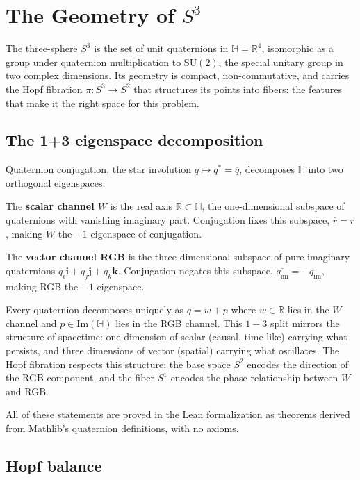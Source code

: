 \documentclass[12pt,a4paper]{article}
\theoremstyle{definition}
\theoremstyle{remark}
\begin{document}
\section{The Geometry of $S^3$}

The three-sphere $S^3$ is the set of unit quaternions in
$\mathbb{H} = \mathbb{R}^4$, isomorphic as a group under quaternion
multiplication to $\mathrm{SU}(2)$, the special unitary group in two complex
dimensions. Its geometry is compact, non-commutative, and carries the Hopf
fibration $\pi: S^3 \to S^2$ that structures its points into fibers: the
features that make it the right space for this problem.

\subsection{The 1+3 eigenspace decomposition}

Quaternion conjugation, the star involution $q \mapsto q^* = \overline{q}$,
decomposes $\mathbb{H}$ into two orthogonal eigenspaces:

\medskip
The \textbf{scalar channel $W$} is the real axis $\mathbb{R} \subset
\mathbb{H}$, the one-dimensional subspace of quaternions with vanishing
imaginary part. Conjugation fixes this subspace, $\overline{r} = r$, making
$W$ the $+1$ eigenspace of conjugation.

\medskip
The \textbf{vector channel RGB} is the three-dimensional subspace of pure
imaginary quaternions $q_i\mathbf{i} + q_j\mathbf{j} + q_k\mathbf{k}$.
Conjugation negates this subspace, $\overline{q_\mathrm{im}} = -q_\mathrm{im}$,
making RGB the $-1$ eigenspace.

\medskip
Every quaternion decomposes uniquely as $q = w + p$ where $w \in \mathbb{R}$
lies in the $W$ channel and $p \in \mathrm{Im}(\mathbb{H})$ lies in the RGB
channel. This $1+3$ split mirrors the structure of spacetime: one dimension
of scalar (causal, time-like) carrying what persists, and three dimensions of
vector (spatial) carrying what oscillates. The Hopf fibration respects this
structure: the base space $S^2$ encodes the direction of the RGB component,
and the fiber $S^1$ encodes the phase relationship between $W$ and RGB.

All of these statements are proved in the Lean formalization as theorems derived
from Mathlib's quaternion definitions, with no axioms.

\subsection{Hopf balance}
\end{document}
